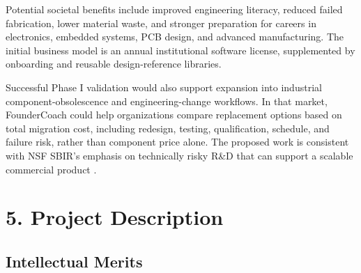 \documentclass[12pt,letterpaper]{article}
\begin{document}
Potential societal benefits include improved engineering literacy, reduced failed fabrication, lower material waste, and stronger preparation for careers in electronics, embedded systems, PCB design, and advanced manufacturing. The initial business model is an annual institutional software license, supplemented by onboarding and reusable design-reference libraries.

Successful Phase I validation would also support expansion into industrial component-obsolescence and engineering-change workflows. In that market, FounderCoach could help organizations compare replacement options based on total migration cost, including redesign, testing, qualification, schedule, and failure risk, rather than component price alone. The proposed work is consistent with NSF SBIR's emphasis on technically risky R\&D that can support a scalable commercial product \cite{nsf26510}.


\section{5. Project Description}
\subsection{Intellectual Merits}

\end{document}
